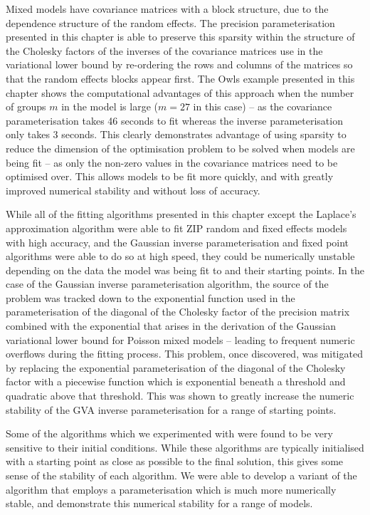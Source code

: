 Mixed models have covariance matrices with a block structure, due to the
dependence structure of the random effects. The precision parameterisation
presented in this chapter is able to preserve this sparsity within the
structure of the Cholesky factors of the inverses of the covariance matrices
use in the variational lower bound by re-ordering the rows and columns of the
matrices so that the random effects blocks appear first. The Owls example
presented in this chapter shows the computational advantages of this approach
when the number of groups $m$ in the model is large ($m=27$ in this case) -- as
the covariance parameterisation takes 46 seconds to fit whereas the inverse
parameterisation only takes 3 seconds. This clearly demonstrates advantage of
using sparsity to reduce the dimension of the optimisation problem to be solved
when models are being fit -- as only the non-zero values in the covariance
matrices need to be optimised over. This allows models to be fit more quickly,
and with greatly improved numerical stability and without loss of accuracy.

While all of the fitting algorithms presented in this chapter except the
Laplace's approximation algorithm were able to fit ZIP random and fixed effects
models with high accuracy, and the  Gaussian inverse parameterisation and fixed
point algorithms were able to do so at high speed, they  could be numerically
unstable depending on the data the model was being fit to and their starting
points. In the case of the Gaussian inverse parameterisation algorithm, the
source of the problem was tracked down to the exponential function used in the
parameterisation of the diagonal of the Cholesky factor of the precision matrix
combined with the exponential that arises in the derivation of the Gaussian
variational lower bound for Poisson mixed models -- leading to frequent numeric
overflows during the fitting process. This problem, once discovered, was
mitigated by replacing the exponential parameterisation of the diagonal of the
Cholesky factor with a piecewise function which is exponential beneath a
threshold and quadratic above that threshold. This was shown to greatly
increase the numeric stability of the GVA inverse parameterisation for a range
of starting points.

Some of the algorithms which we experimented with were found to be very
sensitive to their initial conditions.  While these algorithms are typically
initialised with a starting point as close as possible to the final solution,
this gives some sense of the stability of each algorithm. We were able to
develop a variant of the algorithm that employs a parameterisation which is
much more numerically stable, and demonstrate this numerical stability for a
range of models.

